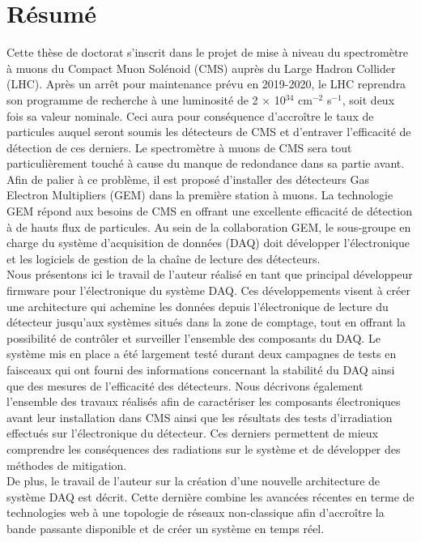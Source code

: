 \chapter*{Résumé}

  Cette thèse de doctorat s'inscrit dans le projet de mise à niveau du spectromètre à muons du Compact Muon Solénoid (CMS) auprès du Large Hadron Collider (LHC). Après un arrêt pour maintenance prévu en 2019-2020, le LHC reprendra son programme de recherche à une luminosité de 2 $\times$ 10$^{34}$ cm$^{-2}$ s$^{-1}$, soit deux fois sa valeur nominale. Ceci aura pour conséquence d'accroître le taux de particules auquel seront soumis les détecteurs de CMS et d'entraver l'efficacité de détection de ces derniers. Le spectromètre à muons de CMS sera tout particulièrement touché à cause du manque de redondance dans sa partie avant. Afin de palier à ce problème, il est proposé d'installer des détecteurs Gas Electron Multipliers (GEM) dans la première station à muons. La technologie GEM répond aux besoins de CMS en offrant une excellente efficacité de détection à de hauts flux de particules. Au sein de la collaboration GEM, le sous-groupe en charge du système d'acquisition de données (DAQ) doit développer l'électronique et les logiciels de gestion de la chaîne de lecture des détecteurs. \\

  Nous présentons ici le travail de l'auteur réalisé en tant que principal développeur firmware pour l'électronique du système DAQ. Ces développements visent à créer une architecture qui achemine les données depuis l'électronique de lecture du détecteur jusqu'aux systèmes situés dans la zone de comptage, tout en offrant la possibilité de contrôler et surveiller l'ensemble des composants du DAQ. Le système mis en place a été largement testé durant deux campagnes de tests en faisceaux qui ont fourni des informations concernant la stabilité du DAQ ainsi que des mesures de l'efficacité des détecteurs. Nous décrivons également l'ensemble des travaux réalisés afin de caractériser les composants électroniques avant leur installation dans CMS ainsi que les résultats des tests d'irradiation effectués sur l'électronique du détecteur. Ces derniers permettent de mieux comprendre les conséquences des radiations sur le système et de développer des méthodes de mitigation. \\

  De plus, le travail de l'auteur sur la création d'une nouvelle architecture de système DAQ est décrit. Cette dernière combine les avancées récentes en terme de technologies web à une topologie de réseaux non-classique afin d'accroître la bande passante disponible et de créer un système en temps réel.
